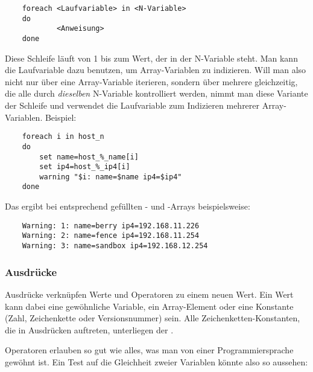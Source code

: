 \begin{enumerate}
\begin{example}
\begin{verbatim}
    foreach <Laufvariable> in <N-Variable>
    do
            <Anweisung>
    done
\end{verbatim}
\end{example}

    Diese Schleife läuft von 1 bis zum Wert, der in der N-Variable steht. Man
    kann die Laufvariable dazu benutzen, um Array-Variablen zu indizieren. Will
    man also nicht nur über eine Array-Variable iterieren, sondern über mehrere
    gleichzeitig, die alle durch \emph{dieselben} N-Variable kontrolliert
    werden, nimmt man diese Variante der Schleife und verwendet die
    Laufvariable zum Indizieren mehrerer Array-Variablen. Beispiel:

\begin{example}
\begin{verbatim}
    foreach i in host_n
    do
        set name=host_%_name[i]
        set ip4=host_%_ip4[i]
        warning "$i: name=$name ip4=$ip4"
    done
\end{verbatim}
\end{example}

    Das ergibt bei entsprechend gefüllten - und
    -Arrays beispielsweise:

\begin{example}
\begin{verbatim}
    Warning: 1: name=berry ip4=192.168.11.226
    Warning: 2: name=fence ip4=192.168.11.254
    Warning: 3: name=sandbox ip4=192.168.12.254
\end{verbatim}
\end{example}

    \end{enumerate}

\subsubsection{Ausdrücke}

    Ausdrücke verknüpfen Werte und Operatoren zu einem neuen Wert. Ein Wert
    kann dabei eine gewöhnliche Variable, ein Array-Element oder eine Konstante
    (Zahl, Zeichenkette oder Versionsnummer) sein. Alle
    Zeichenketten-Konstanten, die in Ausdrücken auftreten, unterliegen der
    .

    Operatoren erlauben so gut wie alles, was man von einer
    Programmiersprache gewöhnt ist. Ein Test auf die Gleichheit zweier Variablen
    könnte also so aussehen:

